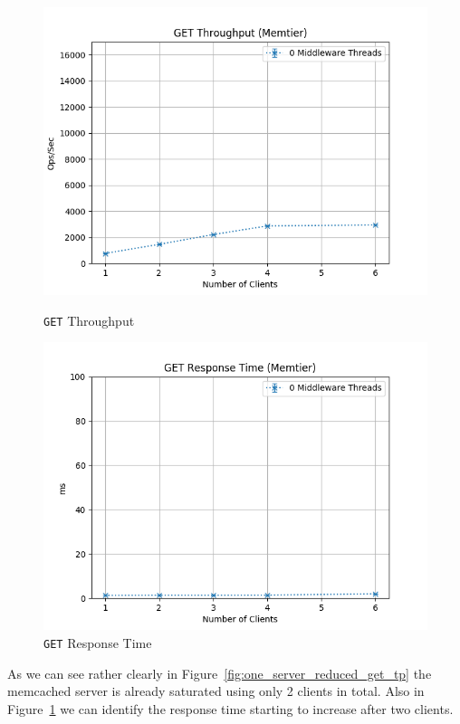 \documentclass[11pt,a4paper]{article}
\begin{document}
\begin{figure}[H]
    \centering
    \begin{minipage}{0.5\textwidth}
        \centering
        \includegraphics[width=\textwidth]{../illustrations/plots/1_1_1_one_server_reduced/0-1/memtier_get_tp_s.png}
        \caption{\texttt{GET} Throughput}
        \label{fig:one_server_reduced_get_tp}
    \end{minipage}\hfill
    \begin{minipage}{0.5\textwidth}
        \centering
        \includegraphics[width=\textwidth]{../illustrations/plots/1_1_1_one_server_reduced/0-1/memtier_get_rt_ms.png}
        \caption{\texttt{GET} Response Time}
        \label{fig:one_server_reduced_get_rt}
    \end{minipage}
\end{figure}
%
As we can see rather clearly in Figure~\ref{fig:one_server_reduced_get_tp} the memcached server is already saturated using only 2 clients in total.
%
Also in Figure~\ref{fig:one_server_reduced_get_rt} we can identify the response time starting to increase after two clients.
%
\end{document}
